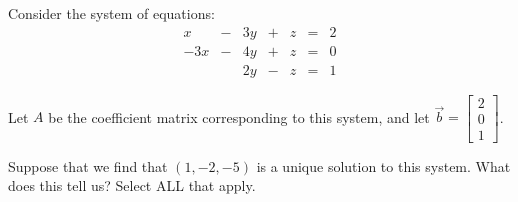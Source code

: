 \documentclass{ximera}
\author{Anna Davis}
\begin{document}
\begin{exercise}
Consider the system of equations:
$$\begin{matrix}
      x& -&3y&+&z&=&2\\
      -3x & -&4y&+&z&= &0\\
       & &2y&-&z&=&1
    \end{matrix}$$

Let $A$ be the coefficient matrix corresponding to this system, and let $\vec{b}=\begin{bmatrix}2\\0\\1\end{bmatrix}$.

Suppose that we find that  $(1, -2, -5)$ is a unique solution to this system.  What does this tell us?  Select ALL that apply.

\begin{selectAll}
 \end{selectAll}
\end{exercise}
\end{document}
